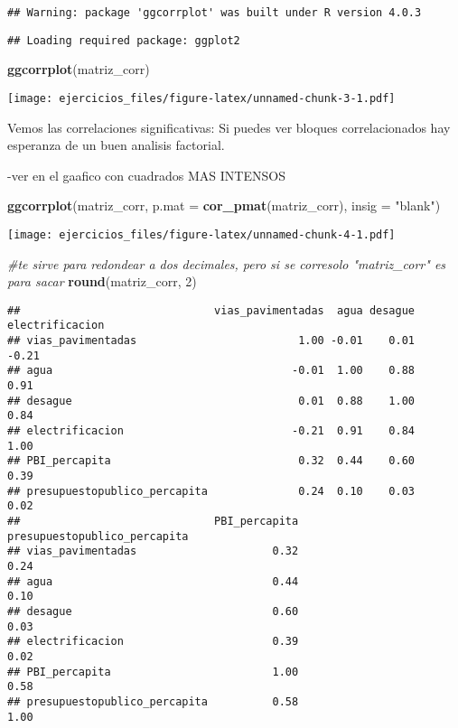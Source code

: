 \documentclass[
]{article}
\newenvironment{Shaded}{\begin{snugshade}}{\end{snugshade}}
\newcommand{\CommentTok}[1]{\textcolor[rgb]{0.56,0.35,0.01}{\textit{#1}}}
\newcommand{\DataTypeTok}[1]{\textcolor[rgb]{0.13,0.29,0.53}{#1}}
\newcommand{\DecValTok}[1]{\textcolor[rgb]{0.00,0.00,0.81}{#1}}
\newcommand{\KeywordTok}[1]{\textcolor[rgb]{0.13,0.29,0.53}{\textbf{#1}}}
\newcommand{\NormalTok}[1]{#1}
\newcommand{\StringTok}[1]{\textcolor[rgb]{0.31,0.60,0.02}{#1}}
\begin{document}
\begin{verbatim}
## Warning: package 'ggcorrplot' was built under R version 4.0.3
\end{verbatim}

\begin{verbatim}
## Loading required package: ggplot2
\end{verbatim}

\begin{Shaded}
\begin{Highlighting}[]
\KeywordTok{ggcorrplot}\NormalTok{(matriz_corr)}
\end{Highlighting}
\end{Shaded}

\texttt{[image: ejercicios\_files/figure-latex/unnamed-chunk-3-1.pdf]}

Vemos las correlaciones significativas: Si puedes ver bloques
correlacionados hay esperanza de un buen analisis factorial.

-ver en el gaafico con cuadrados MAS INTENSOS

\begin{Shaded}
\begin{Highlighting}[]
\KeywordTok{ggcorrplot}\NormalTok{(matriz_corr,}
           \DataTypeTok{p.mat =} \KeywordTok{cor_pmat}\NormalTok{(matriz_corr),}
           \DataTypeTok{insig =} \StringTok{"blank"}\NormalTok{)}
\end{Highlighting}
\end{Shaded}

\texttt{[image: ejercicios\_files/figure-latex/unnamed-chunk-4-1.pdf]}

\begin{Shaded}
\begin{Highlighting}[]
\CommentTok{#te sirve para redondear a dos decimales, pero si se corresolo "matriz_corr" es para sacar}
\KeywordTok{round}\NormalTok{(matriz_corr, }\DecValTok{2}\NormalTok{)}
\end{Highlighting}
\end{Shaded}

\begin{verbatim}
##                              vias_pavimentadas  agua desague electrificacion
## vias_pavimentadas                         1.00 -0.01    0.01           -0.21
## agua                                     -0.01  1.00    0.88            0.91
## desague                                   0.01  0.88    1.00            0.84
## electrificacion                          -0.21  0.91    0.84            1.00
## PBI_percapita                             0.32  0.44    0.60            0.39
## presupuestopublico_percapita              0.24  0.10    0.03            0.02
##                              PBI_percapita presupuestopublico_percapita
## vias_pavimentadas                     0.32                         0.24
## agua                                  0.44                         0.10
## desague                               0.60                         0.03
## electrificacion                       0.39                         0.02
## PBI_percapita                         1.00                         0.58
## presupuestopublico_percapita          0.58                         1.00
\end{verbatim}
\end{document}
